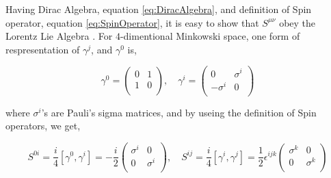 Having Dirac Algebra, equation \ref{eq:DiracAlgebra}, and definition of Spin operator, equation \ref{eq:SpinOperator}, it is easy to show that $S^{\mu\nu}$ obey the Lorentz Lie Algebra \label{eq:LorentzLieAlgebra}. For $4$-dimentional Minkowski space, one form of respresentation of $\gamma^j$, and $\gamma^0$ is,

\begin{equation}
   \gamma^0 = \begin{pmatrix} 0 & 1 \\ 1 & 0 \\ \end{pmatrix}
   , \quad
   \gamma^i = \begin{pmatrix}  0 & \sigma^i \\ -\sigma^i & 0 \\ \end{pmatrix}
\end{equation}

where $\sigma^i$'s are Pauli's sigma matrices, and by useing the definition of Spin operators, we get, 

\begin{equation}
   S^{0i} = \frac{i}{4}\left[\gamma^0,\gamma^i\right] = -\frac{i}{2}
   \begin{pmatrix} \sigma^i & 0 \\ 0 & \sigma^i \\ \end{pmatrix}
   , \quad
   S^{ij} = \frac{i}{4}\left[\gamma^i,\gamma^j\right] = \frac{1}{2}\epsilon^{ijk}
   \begin{pmatrix} \sigma^k & 0 \\ 0 & \sigma^k \\ \end{pmatrix}
\end{equation}



